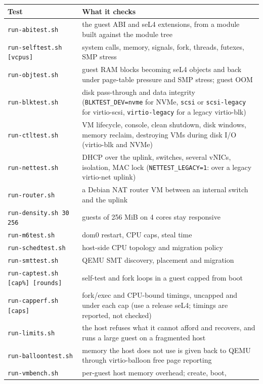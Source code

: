 \documentclass[11pt,a4paper]{report}
\newcommand{\cmd}[1]{\texttt{#1}}
\begin{document}
\begingroup
\small
\begin{longtable}{@{}>{\raggedright\arraybackslash}p{5.6cm}>{\raggedright\arraybackslash}p{8.9cm}@{}}
\toprule
Test & What it checks \\
\midrule
\endhead
\cmd{run-abitest.sh} & the guest ABI and seL4 extensions, from a module
  built against the module tree \\
\cmd{run-selftest.sh [vcpus]} & system calls, memory, signals, fork,
  threads, futexes, SMP stress \\
\cmd{run-objtest.sh} & guest RAM blocks becoming seL4 objects and back
  under page-table pressure and SMP stress; guest OOM \\
\cmd{run-blktest.sh} & disk pass-through and data integrity
  (\texttt{BLKTEST\_DEV=nvme} for NVMe, \texttt{scsi} or
  \texttt{scsi-legacy} for virtio-scsi, \texttt{virtio-legacy} for a
  legacy virtio-blk) \\
\cmd{run-ctltest.sh} & VM lifecycle, console, clean shutdown, disk windows,
  memory reclaim, destroying VMs during disk I/O (virtio-blk and NVMe) \\
\cmd{run-nettest.sh} & DHCP over the uplink, switches, several vNICs,
  isolation, MAC lock (\texttt{NETTEST\_LEGACY=1}: over a legacy
  virtio-net uplink) \\
\cmd{run-router.sh} & a Debian NAT router VM between an internal switch and
  the uplink \\
\cmd{run-density.sh 30 256} & 30 guests of 256 MiB on 4 cores stay
  responsive \\
\cmd{run-m6test.sh} & dom0 restart, CPU caps, steal time \\
\cmd{run-schedtest.sh} & host-side CPU topology and migration policy \\
\cmd{run-smttest.sh} & QEMU SMT discovery, placement and migration \\
\cmd{run-captest.sh [cap\%] [rounds]} & self-test and fork loops in a guest
  capped from boot \\
\cmd{run-capperf.sh [caps]} & fork/exec and CPU-bound timings, uncapped and
  under each cap (use a release seL4; timings are reported, not checked) \\
\cmd{run-limits.sh} & the host refuses what it cannot afford and recovers,
  and runs a large guest on a fragmented host \\
\cmd{run-balloontest.sh} & memory the host does not use is given back to
  QEMU through virtio-balloon free page reporting \\
\cmd{run-vmbench.sh} & per-guest host memory overhead; create, boot,

\end{longtable}
\end{document}
